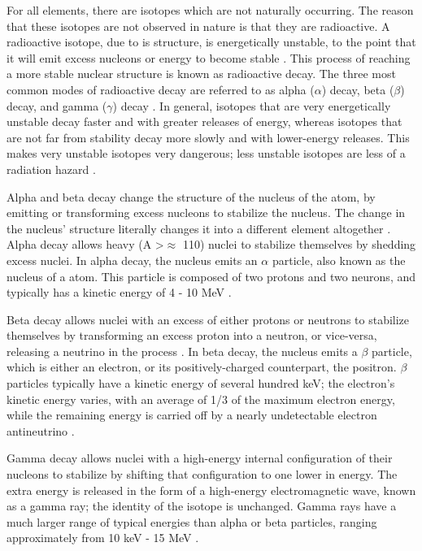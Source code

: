 \documentclass{report}
\begin{document}
For all elements, there are isotopes which are not naturally occurring. The reason that these isotopes are not observed in nature is that they are radioactive. A radioactive isotope, due to is structure, is energetically unstable, to the point that it will emit excess nucleons or energy to become stable \cite{Loveland2005}. This process of reaching a more stable nuclear structure is known as radioactive decay. The three most common modes of radioactive decay are referred to as alpha (\(\alpha\)) decay, beta (\(\beta\)) decay, and gamma (\(\gamma\)) decay \cite{Loveland2005}. In general, isotopes that are very energetically unstable decay faster and with greater releases of energy, whereas isotopes that are not far from stability decay more slowly and with lower-energy releases. This makes very unstable isotopes very dangerous; less unstable isotopes are less of a radiation hazard \cite{krane1987introductory}.

Alpha and beta decay change the structure of the nucleus of the atom, by emitting or transforming excess nucleons to stabilize the nucleus. The change in the nucleus' structure literally changes it into a different element altogether \cite{krane1987introductory}. Alpha decay allows heavy (A \textgreater \(\approx\) 110) nuclei to stabilize themselves by shedding excess nuclei. In alpha decay, the nucleus emits an \(\alpha\) particle, also known as the nucleus of a  atom. This particle is composed of two protons and two neurons, and typically has a kinetic energy of 4 - 10 MeV \cite{krane1987introductory}. 

Beta decay allows nuclei with an excess of either protons or neutrons to stabilize themselves by transforming an excess proton into a neutron, or vice-versa, releasing a neutrino in the process \cite{krane1987introductory}. In beta decay,  the nucleus emits a \(\beta\) particle, which is either an electron, or its positively-charged counterpart, the positron. \(\beta\) particles typically have a kinetic energy of several hundred keV;   the electron's kinetic energy varies, with an average of 1/3 of the maximum electron energy, while the remaining energy is carried off by a nearly undetectable electron antineutrino \cite{krane1987introductory}.

Gamma decay allows nuclei with a high-energy internal configuration of their nucleons to stabilize by shifting that configuration to one lower in energy. The extra energy is released in the form of a high-energy electromagnetic wave, known as a gamma ray; the identity of the isotope is unchanged. Gamma rays have a much larger range of typical energies than alpha or beta particles, ranging approximately from 10 keV - 15 MeV  \cite{krane1987introductory}.  
\end{document}
